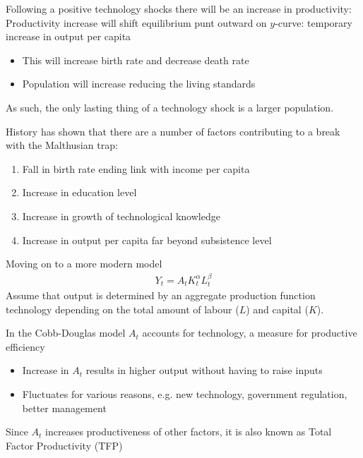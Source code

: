 \documentclass{beamer}
\begin{document}
\begin{frame}
  Following a positive technology shocks there will be an increase in productivity:   
  Productivity increase will shift equilibrium punt outward on $y$-curve: temporary increase in output per capita
  \begin{itemize}    
    \item This will increase birth rate and decrease death rate
    \item Population will increase reducing the living standards
  \end{itemize}
  \medskip
  As such, the only lasting thing of a technology shock is a larger population.
\end{frame}

\begin{frame}
 History has shown that there are a number of factors contributing to a break with the Malthusian trap:
\begin{enumerate}
  \item Fall in birth rate ending link with income per capita
  \item Increase in education level
  \item Increase in growth of technological knowledge
  \item Increase in output per capita far beyond subsistence level
\end{enumerate}
\end{frame}

\begin{frame}
 Moving on to a more modern model  
\begin{align}
  Y_t=A_tK^{\alpha}_tL^{\beta}_t
\end{align}
  \medskip
  Assume that output is determined by an aggregate production function technology depending on the total amount of labour ($L$) and capital ($K$). 
\end{frame}

\begin{frame}
  In the Cobb-Douglas model $A_t$ accounts for technology, a measure for productive efficiency
\begin{itemize}
  \item Increase in $A_t$ results in higher output without having to raise inputs
  \item Fluctuates for various reasons, e.g. new technology, government regulation, better management
\end{itemize} 
\medskip
Since $A_t$ increases productiveness of other factors, it is also known as Total Factor Productivity (TFP)
\end{frame}
\end{document}
